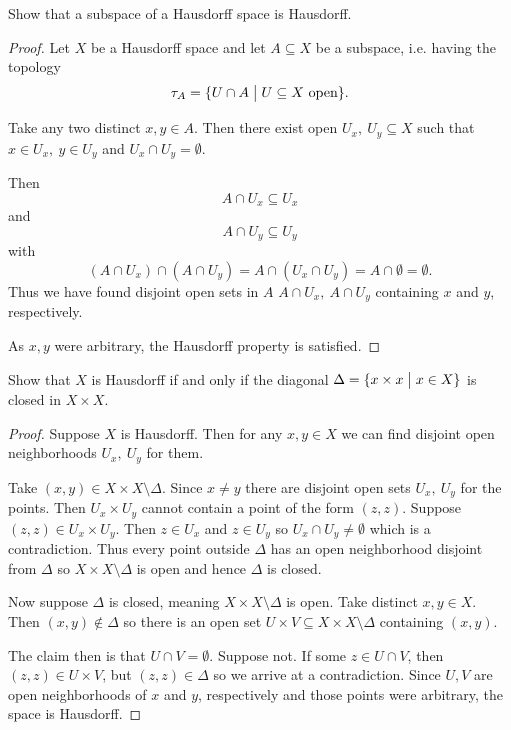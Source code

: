 \begin{prob*}[Munkres 17.12]
    Show that a subspace of a Hausdorff space 
    is Hausdorff. 
\end{prob*}
\begin{proof}
    Let $X$ be a Hausdorff space and let 
    $A \subseteq X$ be a subspace, i.e. 
    having the topology 
    \[
        \tau_A = \{U \cap A \bigm| U \subseteq X \ \text{open}\}. 
    \]

    Take any two distinct 
    $x,y \in A$. Then there exist open 
    $U_x, \ U_y \subseteq X$ such that 
    $x \in U_x, \ y \in U_y$ and 
    $U_x \cap U_y = \emptyset$. 

    Then 
    \[
        A \cap U_x \subseteq U_x
    \]
    and 
    \[
        A \cap U_y \subseteq U_y
    \]
    with 
    \[
        (A \cap U_x) \cap (A \cap U_y) 
        = A \cap (U_x \cap U_y) = A \cap \emptyset = \emptyset. 
    \]
    Thus we have found disjoint open sets in $A$ 
    $A \cap U_x, \ A \cap U_y$ containing 
    $x$ and $y$, respectively. 

    As $x,y$ were arbitrary, the Hausdorff property is satisfied. 
\end{proof}

\begin{prob*}[Munkres 17.13]
    Show that $X$ is Hausdorff if and only if 
    the diagonal $\Delta = \{x \times x \bigm| x \in X\}$ is 
    closed in $X \times X$. 
\end{prob*}

\begin{proof}
    Suppose $X$ is Hausdorff. Then 
    for any $x, y \in X$ we can find 
    disjoint open neighborhoods $U_x, \ U_y$ for them.  
 
    Take $(x,y) \in X\times X \setminus \Delta$. 
    Since $x \neq y$ there are disjoint 
    open sets $U_x, \ U_y$ for the points. 
    Then $U_x \times U_y$ cannot contain 
    a point of the form $(z,z)$. Suppose $(z,z) \in U_x \times U_y$. 
    Then $z \in U_x$ and $z \in U_y$ so $U_x \cap U_y \neq \emptyset$
    which is a contradiction. 
    Thus every point outside $\Delta$ has an open 
    neighborhood disjoint from $\Delta$ so 
    $X\times X \setminus \Delta$ is open and 
    hence $\Delta$ is closed. 

    Now suppose $\Delta$ is closed, meaning 
    $X \times X \setminus \Delta$ is open. 
    Take distinct $x,y \in X$. Then $(x,y) \not\in \Delta$ 
    so there is an open set 
    $U \times V \subseteq X \times X \setminus \Delta$ 
    containing $(x,y)$. 
    
    The claim then is that $U \cap V = \emptyset$. 
    Suppose not. If some $z \in U \cap V$, then 
    $(z,z) \in U \times V$, but $(z,z) \in \Delta$ so 
    we arrive at a contradiction. 
    Since $U,V$ are open neighborhoods of $x$ and $y$, respectively 
    and those points were arbitrary, the space is Hausdorff. 
\end{proof} 


